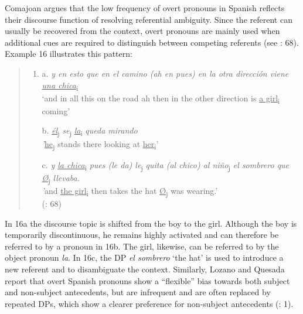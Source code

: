 \documentclass[
  letterpaper,
  DIV=11,
  numbers=noendperiod]{scrartcl}
\begin{document}
Comajoan argues that the low frequency of overt pronouns in Spanish
reflects their discourse function of resolving referential ambiguity.
Since the referent can usually be recovered from the context, overt
pronouns are mainly used when additional cues are required to
distinguish between competing referents (see
: 68). Example 16 illustrates
this pattern:

\begin{quote}
\begin{enumerate}
\def\labelenumi{\arabic{enumi}.}
\setcounter{enumi}{15}
\item
  a. \emph{y en esto que en el camino (ah en pues) en la otra dirección
  viene \ul{una chica}}\textsubscript{i}\\
  `and in all this on the road ah then in the other direction is \ul{a
  girl}\textsubscript{i} coming'

  b. \ul{\emph{él}}\textsubscript{j} \emph{se}\textsubscript{j}
  \ul{\emph{la}}\textsubscript{i} \emph{queda mirando\\
  '}\ul{he}\textsubscript{j} stands there looking at
  \ul{her}\textsubscript{i}'

  c. \emph{y \ul{la chica}}\textsubscript{i} \emph{pues (le da)
  le}\textsubscript{j} \emph{quita (al chico) al niño}\textsubscript{j}
  \emph{el sombrero que \ul{Ø}}\textsubscript{j} \emph{llevaba.\\
  '}and \ul{the girl}\textsubscript{i} then takes the hat
  \ul{Ø}\textsubscript{j} was wearing.'\\
  (: 68)
\end{enumerate}
\end{quote}

In 16a the discourse topic is shifted from the boy to the girl. Although
the boy is temporarily discontinuous, he remains highly activated and
can therefore be referred to by a pronoun in 16b. The girl, likewise,
can be referred to by the object pronoun \emph{la}. In 16c, the DP
\emph{el sombrero} `the hat' is used to introduce a new referent and to
disambiguate the context. Similarly, Lozano and Quesada report that
overt Spanish pronouns show a ``flexible'' bias towards both subject and
non-subject antecedents, but are infrequent and are often replaced by
repeated DPs, which show a clearer preference for non-subject
antecedents (: 1).
\end{document}
